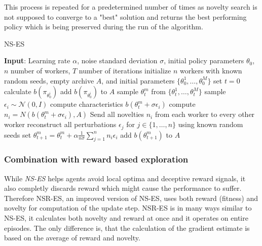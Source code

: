 This process is repeated for a predetermined number of times as novelty search is not supposed to converge to a "best" solution and returns the best performing policy which is being preserved during the run of the algorithm.

\begin{algorithm}
    \begin{algorithmic}[1]
    \caption{NS-ES}
    \label{alg:ns-es}
        \State \textbf{Input}: Learning rate $\alpha$, noise standard deviation $\sigma$, initial policy parameters $\theta_0$, $n$ number of workers, $T$ number of iterations
        \State initialize $n$ workers with known random seeds, empty archive $A$, and initial parameters $\{\theta^1_0,\dots, \theta^M_0\}$
        \State set $t=0$
            \State calculate $b(\pi_{\theta^i_0})$
            \State add $b(\pi_{\theta^i_0})$ to $A$
        \EndFor
            \State sample $\theta_t^m$ from $\{\theta^1_t,\dots, \theta^M_t\}$
                \State sample $\epsilon_i \sim \mathcal{N}(0,I)$ 
                \State compute characteristics $b(\theta^m_t+\sigma\epsilon_i)$
                \State compute $n_i = N(b(\theta^m_t+\sigma\epsilon_i), A)$
            \EndFor
            \State Send all novelties $n_i$ from each worker to every other worker
                \State reconstruct all perturbations $\epsilon_j $ for $j \in \{1,\dots,n\}$ using known random seeds
                \State set $\theta^m_{t+1} = \theta_t^m + \alpha \frac{1}{n\sigma}\sum_{j=1}^nn_i\epsilon_i$
                \State add $b(\theta^m_{t+1})$ to $A$
            \EndFor
        \EndFor
    \end{algorithmic}
\end{algorithm}


\subsubsection{Combination with reward based exploration}
While \emph{NS-ES} helps agents avoid local optima and deceptive reward signals, it also completly discards reward which might cause the performance to suffer. Therefore NSR-ES, an improved version of NS-ES, uses both reward (fitness) and novelty for computation of the update step. NSR-ES is in many ways similar to NS-ES, it calculates both novelty and reward at once and it operates on entire episodes. The only difference is, that the calculation of the gradient estimate is based on the average of reward and novelty. 

